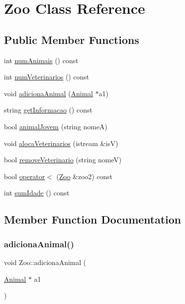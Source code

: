 \hypertarget{class_zoo}{}\section{Zoo Class Reference}
\label{class_zoo}
\subsection*{Public Member Functions}
\begin{DoxyCompactItemize}
\item 
int \mbox{\hyperlink{class_zoo_acfffd5509d859246eece72999610f12f}{num\+Animais}} () const
\item 
int \mbox{\hyperlink{class_zoo_a29354c84f702516e6be3164fa8511bb7}{num\+Veterinarios}} () const
\item 
void \mbox{\hyperlink{class_zoo_a03aa9b418835fdd9a51d883da3a55381}{adiciona\+Animal}} (\mbox{\hyperlink{class_animal}{Animal}} $\ast$a1)
\item 
string \mbox{\hyperlink{class_zoo_a21318dae5e1ecd14035abbf615ff55fc}{get\+Informacao}} () const
\item 
bool \mbox{\hyperlink{class_zoo_ad0a75b142f45a604df773593b9dae897}{animal\+Jovem}} (string nomeA)
\item 
void \mbox{\hyperlink{class_zoo_ae9c4942d74b1a1ab2ca4c8dd9e813e35}{aloca\+Veterinarios}} (istream \&isV)
\item 
bool \mbox{\hyperlink{class_zoo_adfa0c404d6e18e9576524d42f835aea6}{remove\+Veterinario}} (string nomeV)
\item 
bool \mbox{\hyperlink{class_zoo_a356d0617e61e139243faaf77c003ada2}{operator$<$}} (\mbox{\hyperlink{class_zoo}{Zoo}} \&zoo2) const
\item 
int \mbox{\hyperlink{class_zoo_ab96552c5262173467c7eaf5d7908c18e}{sum\+Idade}} () const
\end{DoxyCompactItemize}


\subsection{Member Function Documentation}
\mbox{\label{class_zoo_a03aa9b418835fdd9a51d883da3a55381}} 
\subsubsection{\texorpdfstring{adiciona\+Animal()}{adicionaAnimal()}}
{\footnotesize\ttfamily void Zoo\+::adiciona\+Animal (\begin{DoxyParamCaption}\item[{\mbox{\hyperlink{class_animal}{Animal}} $\ast$}]{a1 }\end{DoxyParamCaption})}

